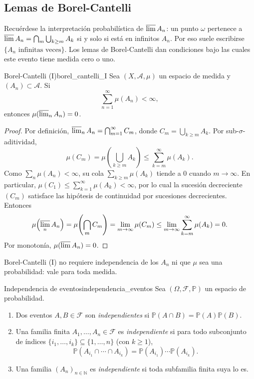 \documentclass[11pt, a4paper]{article}
\begin{document}
\subsection{Lemas de Borel-Cantelli}

Recuérdese la interpretación probabilística de $\varlimsup A_n$: un punto $\omega$ pertenece
a $\varlimsup A_n = \bigcap_m \bigcup_{k \ge m} A_k$ si y solo si está en infinitos $A_n$. Por
eso suele escribirse $\{A_n \text{ infinitas veces}\}$. Los lemas de Borel-Cantelli dan
condiciones bajo las cuales este evento tiene medida cero o uno.

\begin{teorema}{Borel-Cantelli (I)}{borel_cantelli_I}
Sea $(X, \mathcal{A}, \mu)$ un espacio de medida y $(A_n) \subset \mathcal{A}$. Si
$$ \sum_{n=1}^\infty \mu(A_n) < \infty, $$
entonces $\mu(\varlimsup_n A_n) = 0$.
\end{teorema}

\begin{proof}
Por definición, $\varlimsup_n A_n = \bigcap_{m=1}^\infty C_m$, donde $C_m = \bigcup_{k \ge m}
A_k$. Por sub-$\sigma$-aditividad,
$$ \mu(C_m) = \mu\!\left(\bigcup_{k \ge m} A_k\right) \le \sum_{k=m}^\infty \mu(A_k). $$
Como $\sum_n \mu(A_n) < \infty$, su cola $\sum_{k \ge m} \mu(A_k)$ tiende a $0$ cuando $m \to
\infty$. En particular, $\mu(C_1) \le \sum_{k=1}^\infty \mu(A_k) < \infty$, por lo cual la
sucesión decreciente $(C_m)$ satisface las hipótesis de continuidad por sucesiones
decrecientes. Entonces
$$ \mu\!\left(\varlimsup_n A_n\right) = \mu\!\left(\bigcap_m C_m\right) = \lim_{m \to \infty}
\mu(C_m) \le \lim_{m \to \infty} \sum_{k=m}^\infty \mu(A_k) = 0. $$
Por monotonía, $\mu(\varlimsup A_n) = 0$.
\end{proof}

\obs Borel-Cantelli (I) no requiere independencia de los $A_n$ ni que $\mu$ sea una probabilidad:
vale para toda medida.

\begin{definicion}{Independencia de eventos}{independencia_eventos}
Sea $(\Omega, \mathcal{F}, \mathbb{P})$ un espacio de probabilidad.
\begin{enumerate}
    \item Dos eventos $A, B \in \mathcal{F}$ son \emph{independientes} si
    $\mathbb{P}(A \cap B) = \mathbb{P}(A) \mathbb{P}(B)$.
    \item Una familia finita $A_1, \dots, A_n \in \mathcal{F}$ es \emph{independiente} si para todo
    subconjunto de índices $\{i_1, \dots, i_k\} \subseteq \{1, \dots, n\}$ (con $k \ge 1$),
    $$ \mathbb{P}(A_{i_1} \cap \cdots \cap A_{i_k}) = \mathbb{P}(A_{i_1}) \cdots
    \mathbb{P}(A_{i_k}). $$
    \item Una familia $(A_n)_{n \in \mathbb{N}}$ es \emph{independiente} si toda subfamilia finita
    suya lo es.
\end{enumerate}
\end{definicion}
\end{document}
